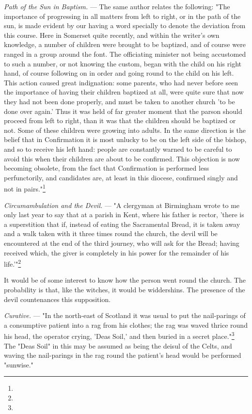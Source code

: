 \documentclass[a4paper, 11pt, oneside, polutonikogreek, english]{article}
\begin{document}
\emph{Path of the Sun in Baptism.} --- The same author relates the following: "The importance of progressing in all matters from left to right, or in the path of the sun, is made evident by our having a word specially to denote the deviation from this course. Here in Somerset quite recently, and within the writer's own knowledge, a number of children were brought to be baptized, and of course were ranged in a group around the font. The officiating minister not being accustomed to such a number, or not knowing the custom, began with the child on his right hand, of course following on in order and going round to the child on his left. This action caused great indignation: some parents, who had never before seen the importance of having their children baptized at all, were quite sure that now they had not been done properly, and must be taken to another church 'to be done over again.' Thus it was held of far greater moment that the parson should proceed from left to right, than it was that the children should be baptized or not. Some of these children were growing into adults. In the same direction is the belief that in Confirmation it is most unlucky to be on the left side of the bishop, and so to receive his left hand: people are constantly warned to be careful to avoid this when their children are about to be confirmed. This objection is now becoming obsolete, from the fact that Confirmation is performed less perfunctorily, and candidates are, at least in this diocese, confirmed singly and not in pairs."\footnote{}

\emph{Circumambulation and the Devil.} --- "A clergyman at Birmingham wrote to me only last year to say that at a parish in Kent, where his father is rector, 'there is a superstition that if, instead of eating the Sacramental Bread, it is taken away and a walk taken with it three times round the church, the devil will be encountered at the end of the third journey, who will ask for the Bread; having received which, the giver is completely in his power for the remainder of his life.'"\footnote{}

It would be of some interest to know how the person went round the church. The probability is that, like the witches, it would be widdershins. The presence of the devil countenances this supposition.

\emph{Curative.} --- "In the north-east of Scotland it was usual to put the nail-parings of a consumptive patient into a rag from his clothes; the rag was waved thrice round his head, the operator crying, 'Deas Soil,' and then buried in a secret place."\footnote{} The "Deas Soil" in this may be assumed as being the deisul of the Celts, and waving the nail-parings in the rag round the patient's head would be performed "sunwise."
\end{document}
